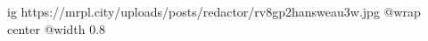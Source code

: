  
 
 
 
 

\ifcmt
  ig https://mrpl.city/uploads/posts/redactor/rv8gp2hansweau3w.jpg
  @wrap center
  @width 0.8
\fi
